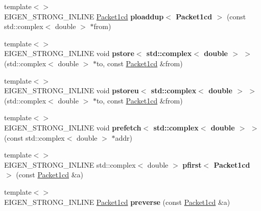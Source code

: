 \begin{DoxyCompactItemize}
\mbox{\label{namespace_eigen_1_1internal_a985e1b0734993f441b31e6ec9d6d3595}} 
{\footnotesize template$<$$>$ }\\E\+I\+G\+E\+N\+\_\+\+S\+T\+R\+O\+N\+G\+\_\+\+I\+N\+L\+I\+NE \hyperlink{struct_eigen_1_1internal_1_1_packet1cd}{Packet1cd} {\bfseries ploaddup$<$ Packet1cd $>$} (const std\+::complex$<$ double $>$ $\ast$from)
\item 
\mbox{\label{namespace_eigen_1_1internal_ac3a7ba58a8b93ca7d2eae12dfdc9fd6a}} 
{\footnotesize template$<$$>$ }\\E\+I\+G\+E\+N\+\_\+\+S\+T\+R\+O\+N\+G\+\_\+\+I\+N\+L\+I\+NE void {\bfseries pstore$<$ std\+::complex$<$ double $>$ $>$} (std\+::complex$<$ double $>$ $\ast$to, const \hyperlink{struct_eigen_1_1internal_1_1_packet1cd}{Packet1cd} \&from)
\item 
\mbox{\label{namespace_eigen_1_1internal_af191111bb5f3f829cea1686d15101839}} 
{\footnotesize template$<$$>$ }\\E\+I\+G\+E\+N\+\_\+\+S\+T\+R\+O\+N\+G\+\_\+\+I\+N\+L\+I\+NE void {\bfseries pstoreu$<$ std\+::complex$<$ double $>$ $>$} (std\+::complex$<$ double $>$ $\ast$to, const \hyperlink{struct_eigen_1_1internal_1_1_packet1cd}{Packet1cd} \&from)
\item 
\mbox{\label{namespace_eigen_1_1internal_ab4388c5a5a5258243a3d41c2119b66ec}} 
{\footnotesize template$<$$>$ }\\E\+I\+G\+E\+N\+\_\+\+S\+T\+R\+O\+N\+G\+\_\+\+I\+N\+L\+I\+NE void {\bfseries prefetch$<$ std\+::complex$<$ double $>$ $>$} (const std\+::complex$<$ double $>$ $\ast$addr)
\item 
\mbox{\label{namespace_eigen_1_1internal_ae472932afc416de969005b3737d7062c}} 
{\footnotesize template$<$$>$ }\\E\+I\+G\+E\+N\+\_\+\+S\+T\+R\+O\+N\+G\+\_\+\+I\+N\+L\+I\+NE std\+::complex$<$ double $>$ {\bfseries pfirst$<$ Packet1cd $>$} (const \hyperlink{struct_eigen_1_1internal_1_1_packet1cd}{Packet1cd} \&a)
\item 
\mbox{\label{namespace_eigen_1_1internal_a6dab39bfea3754ef2994956e30d02a35}} 
{\footnotesize template$<$$>$ }\\E\+I\+G\+E\+N\+\_\+\+S\+T\+R\+O\+N\+G\+\_\+\+I\+N\+L\+I\+NE \hyperlink{struct_eigen_1_1internal_1_1_packet1cd}{Packet1cd} {\bfseries preverse} (const \hyperlink{struct_eigen_1_1internal_1_1_packet1cd}{Packet1cd} \&a)

\end{DoxyCompactItemize}
